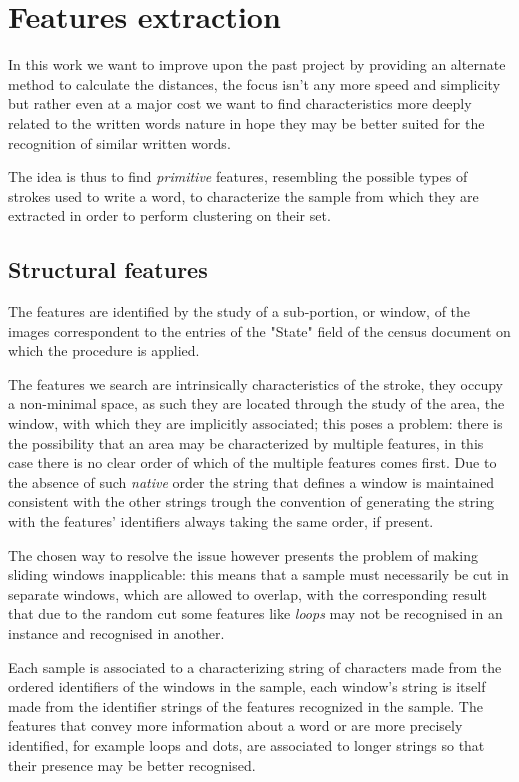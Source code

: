 \section{Features extraction}

In this work we want to improve upon the past project by providing an alternate method to calculate the distances, the focus isn't any more speed and simplicity but rather even at a major cost we want to find characteristics more deeply related to the written words nature in hope they may be better suited for the recognition of similar written words.


The idea is thus to find \emph{primitive} features, resembling the possible types of strokes used to write a word, to characterize the sample from which they are extracted in order to perform clustering on their set.

\subsection{Structural features}

The features are identified by the study of a sub-portion, or window, of the images correspondent to the entries of the "State" field of the census document on which the procedure is applied.

The features we search are intrinsically characteristics of the stroke, they occupy a non-minimal space, as such they are located through the study of the area, the window, with which they are implicitly associated; this poses a problem: there is the possibility that an area may be characterized by multiple features, in this case there is no clear order of which of the multiple features comes first.
Due to the absence of such \emph{native} order the string that defines a window is maintained consistent with the other strings trough the convention of generating the string with the features' identifiers always taking the same order, if present.

The chosen way to resolve the issue however presents the problem of making sliding windows inapplicable: this means that a sample must necessarily be cut in separate windows, which are allowed to overlap, with the corresponding result that due to the random cut some features like \textit{loops} may not be recognised in an instance and recognised in another. 

Each sample is associated to a characterizing string of characters made from the ordered identifiers of the windows in the sample, each window's string is itself made from the identifier strings of the features recognized in the sample.
The features that convey more information about a word or are more precisely identified, for example loops and dots, are associated to longer strings so that their presence may be better recognised.

